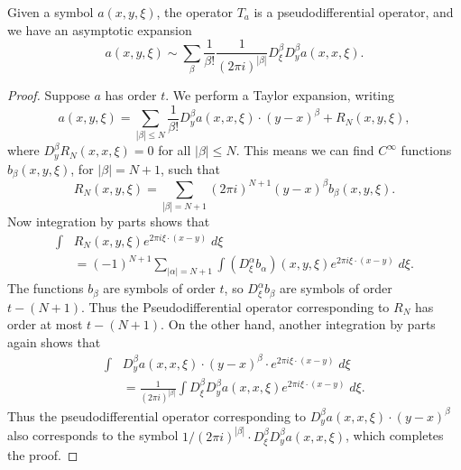 \begin{lemma}
    Given a symbol $a(x,y,\xi)$, the operator $T_a$ is a pseudodifferential operator, and we have an asymptotic expansion
    \[ a(x,y,\xi) \sim \sum_\beta \frac{1}{\beta!} \frac{1}{(2 \pi i)^{|\beta|}} D^\beta_\xi D^\beta_y a(x,x,\xi). \]
\end{lemma}
\begin{proof}
    Suppose $a$ has order $t$. We perform a Taylor expansion, writing
    \[ a(x,y,\xi) = \sum_{|\beta| \leq N} \frac{1}{\beta !} D^\beta_y a(x,x,\xi) \cdot (y - x)^\beta + R_N(x,y,\xi), \]
    where $D^\beta_y R_N(x,x,\xi) = 0$ for all $|\beta| \leq N$. This means we can find $C^\infty$ functions $b_\beta(x,y,\xi)$, for $|\beta| = N+1$, such that
    \[ R_N(x,y,\xi) = \sum_{|\beta| = N+1} (2\pi i)^{N+1} (y - x)^\beta b_\beta(x,y,\xi). \]
    Now integration by parts shows that
    \begin{align*}
        \int & R_N(x,y,\xi) e^{2 \pi i \xi \cdot (x - y)}\; d\xi\\
        &= (-1)^{N+1} \sum_{|\alpha| = N+1} \int (D_\xi^\alpha b_\alpha)(x,y,\xi) e^{2 \pi i \xi \cdot (x - y)}\; d\xi.
    \end{align*}
    The functions $b_\beta$ are symbols of order $t$, so $D_\xi^\alpha b_\beta$ are symbols of order $t - (N+1)$. Thus the Pseudodifferential operator corresponding to $R_N$ has order at most $t - (N+1)$. On the other hand, another integration by parts again shows that
    \begin{align*}
        \int &D^\beta_y a(x,x,\xi) \cdot (y - x)^\beta \cdot e^{2 \pi i \xi \cdot (x - y)}\; d\xi\\
        &= \frac{1}{(2 \pi i)^{|\beta|}} \int D^\beta_\xi D^\beta_y a(x,x,\xi) e^{2 \pi i \xi \cdot (x - y)}\; d\xi.
    \end{align*}
    Thus the pseudodifferential operator corresponding to $D^\beta_y a(x,x,\xi) \cdot (y - x)^\beta$ also corresponds to the symbol $1 / (2 \pi i)^{|\beta|} \cdot D^\beta_\xi D^\beta_y a(x,x,\xi)$, which completes the proof.
\end{proof}

